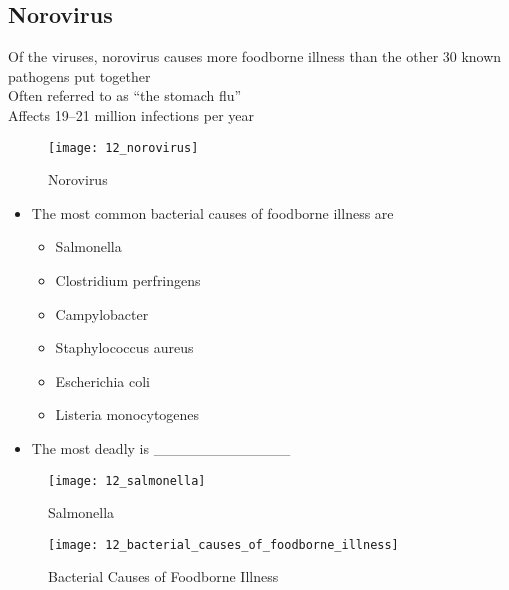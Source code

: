 \documentclass[title={Chapter 12}]{fdsn201notes}
\begin{document}
\subsection{Norovirus}\label{subsec:norovirus}

Of the viruses, norovirus causes more foodborne illness than the other 30 known pathogens put together\\
Often referred to as “the stomach flu”\\
Affects 19–21 million infections per year

\begin{figure}[H]
	\centering
	\texttt{[image: 12\_norovirus]}
	\caption{Norovirus}
	\label{fig:}
\end{figure}

\pagebreak

\begin{itemize}
	\item The most common bacterial causes of foodborne illness are
	\begin{itemize}
		\item Salmonella
		\item Clostridium perfringens
		\item Campylobacter
		\item Staphylococcus aureus
		\item Escherichia coli
		\item Listeria monocytogenes
	\end{itemize}
	\item The most deadly is \_\_\_\_\_\_\_\_\_\_\_\_\_
\end{itemize}

\begin{figure}[H]
	\centering
	\texttt{[image: 12\_salmonella]}
	\caption{Salmonella}
	\label{fig:salmonella}
\end{figure}

\begin{figure}[H]
	\centering
	\texttt{[image: 12\_bacterial\_causes\_of\_foodborne\_illness]}
	\caption{Bacterial Causes of Foodborne Illness}
	\label{fig:bacterial-causes-of-foodborne-illness}
\end{figure}
\end{document}
